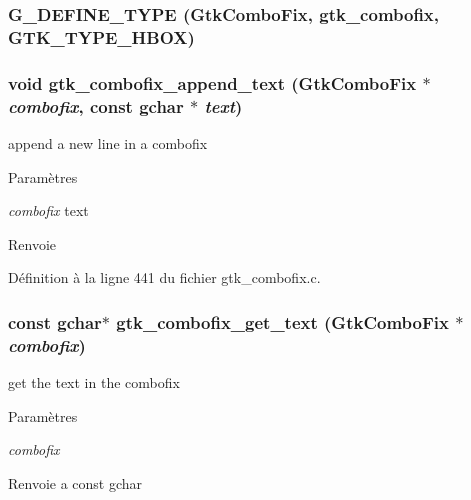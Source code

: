 \subsubsection[{G\_\-DEFINE\_\-TYPE}]{\setlength{\rightskip}{0pt plus 5cm}G\_\-DEFINE\_\-TYPE ({\bf GtkComboFix}, \/  gtk\_\-combofix, \/  GTK\_\-TYPE\_\-HBOX)}\label{gtk__combofix_8c_a7d936459b8df5a5179ec555572539ad7}
\subsubsection[{gtk\_\-combofix\_\-append\_\-text}]{\setlength{\rightskip}{0pt plus 5cm}void gtk\_\-combofix\_\-append\_\-text ({\bf GtkComboFix} $\ast$ {\em combofix}, \/  const gchar $\ast$ {\em text})}\label{gtk__combofix_8c_a18cf71b93180a5a0699f90ed7d76e32c}
append a new line in a combofix


\begin{DoxyParams}{Paramètres}
\item[{\em combofix}]text\end{DoxyParams}
\begin{DoxyReturn}{Renvoie}

\end{DoxyReturn}


Définition à la ligne 441 du fichier gtk\_\-combofix.c.

\subsubsection[{gtk\_\-combofix\_\-get\_\-text}]{\setlength{\rightskip}{0pt plus 5cm}const gchar$\ast$ gtk\_\-combofix\_\-get\_\-text ({\bf GtkComboFix} $\ast$ {\em combofix})}\label{gtk__combofix_8c_a957ebcb179fe43537f34c0e4134dc182}
get the text in the combofix


\begin{DoxyParams}{Paramètres}
\item[{\em combofix}]\end{DoxyParams}
\begin{DoxyReturn}{Renvoie}
a const gchar 
\end{DoxyReturn}



